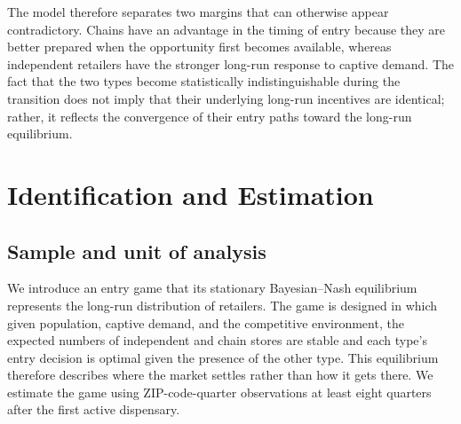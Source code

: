 \documentclass[english,12pt]{article}
\begin{document}
The model therefore separates two margins that can otherwise appear contradictory. Chains have an advantage in the timing of entry because they are better prepared when the opportunity first becomes available, whereas independent retailers have the stronger long-run response to captive demand. The fact that the two types become statistically indistinguishable during the transition does not imply that their underlying long-run incentives are identical; rather, it reflects the convergence of their entry paths toward the long-run equilibrium.

%
\section{Identification and Estimation}
\label{sec:identification}

\subsection{Sample and unit of analysis}

We introduce an entry game that its stationary Bayesian--Nash equilibrium represents the long-run distribution of retailers. The game is designed in which given population, captive demand, and the competitive environment, the expected numbers of independent and chain stores are stable and each type's entry decision is optimal given the presence of the other type. This equilibrium therefore describes where the market settles rather than how it gets there. We estimate the game using ZIP-code-quarter observations at least eight quarters after the first active dispensary. 
\end{document}
